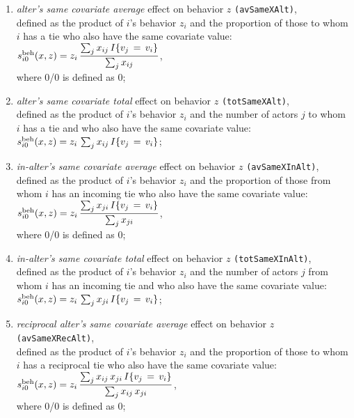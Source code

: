 \documentclass[a4paper,fleqn,11pt]{article}
\newcommand{\+}{\, + \,}
\newcommand{\vit}{\theenumi}
\begin{document}
\begin{enumerate}
\item \emph{alter's same covariate average } effect on behavior $z$
 \texttt{(avSameXAlt)},\\
      defined as the product of $i$'s behavior $z_i$ and
      the proportion of those to whom $i$ has a tie
      who also have the same covariate value:
       $s^{\rm beh}_{i\vit}(x, z) = z_i \,  \displaystyle
            \frac{\sum_j x_{ij} \, I\{v_j\,=\,v_i\} }{\sum_j x_{ij} }$,\\
      where 0/0 is defined as 0;

\item \emph{alter's same covariate total } effect on behavior $z$
 \texttt{(totSameXAlt)},\\
      defined as the product of $i$'s behavior $z_i$ and
      the number of actors $j$ to whom $i$ has a  tie
      and who also have the same covariate value:\\
       $s^{\rm beh}_{i\vit}(x, z) = z_i \,
            \sum_j x_{ij} \, I\{v_j\,=\,v_i\} $; \\



\item \emph{in-alter's same covariate average } effect on behavior $z$
 \texttt{(avSameXInAlt)},\\
      defined as the product of $i$'s behavior $z_i$ and
      the proportion of those from whom $i$ has an incoming tie
      who also have the same covariate value:
       $s^{\rm beh}_{i\vit}(x, z) = z_i \,  \displaystyle
            \frac{\sum_j x_{ji} \, I\{v_j\,=\,v_i\} }{\sum_j x_{ji} }$,\\
      where 0/0 is defined as 0;

\item \emph{in-alter's same covariate total } effect on behavior $z$
 \texttt{(totSameXInAlt)},\\
      defined as the product of $i$'s behavior $z_i$ and
      the number of actors $j$ from whom $i$ has an incoming tie
      and who also have the same covariate value:\\
       $s^{\rm beh}_{i\vit}(x, z) = z_i \,
            \sum_j x_{ji} \, I\{v_j\,=\,v_i\} $; \\




\item \emph{reciprocal alter's same covariate average } effect on behavior $z$
 \texttt{(avSameXRecAlt)},\\
      defined as the product of $i$'s behavior $z_i$ and
      the proportion of those to whom $i$ has a reciprocal tie
      who also have the same covariate value:\\[0.4em]
       $s^{\rm beh}_{i\vit}(x, z) = z_i \,  \displaystyle
            \frac{\sum_j x_{ij}\,x_{ji} \, I\{v_j\,=\,v_i\} }{\sum_j x_{ij}\,x_{ji} }$,\\
      where 0/0 is defined as 0;


\end{enumerate}
\end{document}
